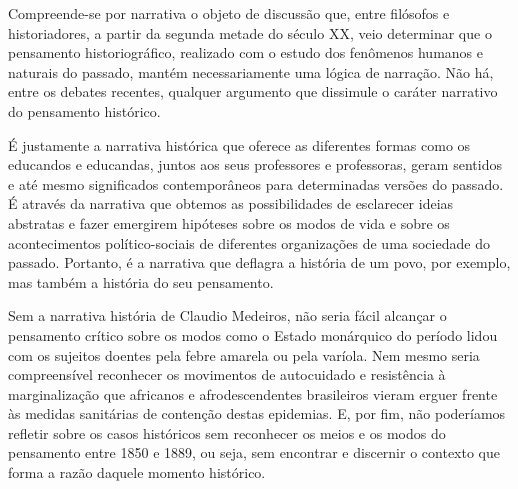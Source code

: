 Compreende-se por narrativa o objeto de discussão que, entre filósofos e
historiadores, a partir da segunda metade do século XX, veio determinar
que o pensamento historiográfico, realizado com o estudo dos fenômenos
humanos e naturais do passado, mantém necessariamente uma lógica de
narração. Não há, entre os debates recentes, qualquer argumento que
dissimule o caráter narrativo do pensamento histórico.

É justamente a narrativa histórica que oferece as diferentes formas como
os educandos e educandas, juntos aos seus professores e professoras,
geram sentidos e até mesmo significados contemporâneos para determinadas
versões do passado. É através da narrativa que obtemos as possibilidades
de esclarecer ideias abstratas e fazer emergirem hipóteses sobre os
modos de vida e sobre os acontecimentos político-sociais de diferentes
organizações de uma sociedade do passado. Portanto, é a narrativa que
deflagra a história de um povo, por exemplo, mas também a história do
seu pensamento.

Sem a narrativa história de Claudio Medeiros, não seria fácil alcançar o
pensamento crítico sobre os modos como o Estado monárquico do período
lidou com os sujeitos doentes pela febre amarela ou pela varíola. Nem
mesmo seria compreensível reconhecer os movimentos de autocuidado e
resistência à marginalização que africanos e afrodescendentes
brasileiros vieram erguer frente às medidas sanitárias de contenção
destas epidemias. E, por fim, não poderíamos refletir sobre os casos
históricos sem reconhecer os meios e os modos do pensamento entre 1850 e
1889, ou seja, sem encontrar e discernir o contexto que forma a razão
daquele momento histórico.
